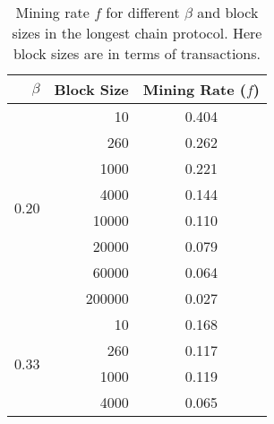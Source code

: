 \begin{table}[t]
	\centering
        \caption[Mining rate in the longest chain protocol.]{Mining rate $f$ for different $\beta$ and block sizes in the longest chain protocol. Here block sizes are in terms of transactions.}
	\begin{tabular}{ r | r | c } 
	 \hline
	 $\beta$ & Block Size & Mining Rate ($f$) \\ [0.5ex] 
	 \hline\hline
	 \multirow{8}{*}{0.20} & 10 & 0.404 \\
	                       & 260 & 0.262 \\
	                       & 1000 & 0.221 \\
	                       & 4000 & 0.144 \\
	                       & 10000 & 0.110 \\
	                       & 20000 & 0.079 \\
	                       & 60000 & 0.064 \\
	                       & 200000 & 0.027 \\
	 \hline
	 \multirow{4}{*}{0.33} & 10 & 0.168 \\
	                       & 260 & 0.117 \\
	                       & 1000 & 0.119 \\
	                       & 4000 & 0.065 \\
	 \hline
	\end{tabular}
\label{table:lc-params}
\end{table}




